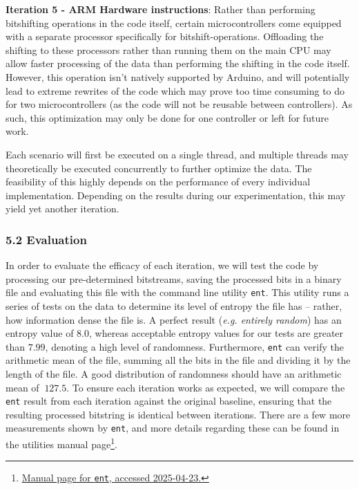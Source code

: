 \textbf{Iteration 5 - ARM Hardware instructions}: Rather than performing bitshifting operations in the code itself, certain microcontrollers come equipped with a separate processor specifically for bitshift-operations. Offloading the shifting to these processors rather than running them on the main CPU may allow faster processing of the data than performing the shifting in the code itself. However, this operation isn't natively supported by Arduino, and will potentially lead to extreme rewrites of the code which may prove too time consuming to do for two microcontrollers (as the code will not be reusable between controllers). As such, this optimization may only be done for one controller or left for future work.

Each scenario will first be executed on a single thread, and multiple threads may theoretically be executed concurrently to further optimize the data. The feasibility of this highly depends on the performance of every individual implementation. Depending on the results during our experimentation, this may yield yet another iteration.

\subsubsection{5.2 Evaluation}\label{evaluation}

In order to evaluate the efficacy of each iteration, we will test the code by processing our pre-determined bitstreams, saving the processed bits in a binary file and evaluating this file with the command line utility \texttt{ent}. This utility runs a series of tests on the data to determine its level of entropy the file has -- rather, how information dense the file is. A perfect result (\emph{e.g. entirely random}) has an entropy value of \(8.0\), whereas acceptable entropy values for our tests are greater than \(7.99\), denoting a high level of randomness. Furthermore, \texttt{ent} can verify the arithmetic mean of the file, summing all the bits in the file and dividing it by the length of the file. A good distribution of randomness should have an arithmetic mean of \(~127.5\). To ensure each iteration works as expected, we will compare the \texttt{ent} result from each iteration against the original baseline, ensuring that the resulting processed bitstring is identical between iterations. There are a few more measurements shown by \texttt{ent}, and more details regarding these can be found in the utilities manual page\footnote{\href{https://manpages.ubuntu.com/manpages/trusty/man1/ent.1.html}{Manual page for \texttt{ent}, accessed 2025-04-23.}}.

